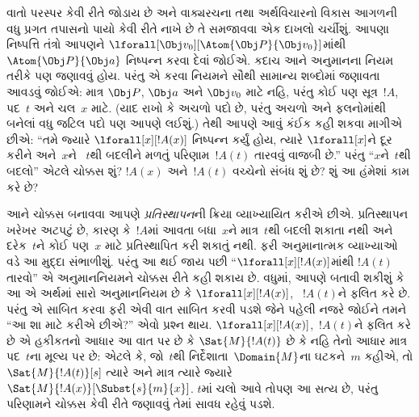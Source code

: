 
\label{guunit:OLP-0146}


વાતો પરસ્પર કેવી રીતે જોડાય છે અને વાક્યરચના તથા અર્થવિચારનો વિકાસ
આગળની વધુ પ્રગત તપાસનો પાયો કેવી રીતે નાખે છે તે સમજાવવા એક દાખલો
ચર્ચીશું. આપણા નિષ્પત્તિ તંત્રો આપણને
$\lforall[\Obj v_0][\Atom{\Obj P}{\Obj v_0}]$માંથી
$\Atom{\Obj P}{\Obj a}$ નિષ્પન્ન કરવા દેવાં જોઈએ. કદાચ આને
અનુમાનના નિયમ તરીકે પણ જણાવવું હોય. પરંતુ એ કરવા નિયમને સૌથી સામાન્ય
શબ્દોમાં જણાવતા આવડવું જોઈએ: માત્ર $\Obj P$, $\Obj a$ અને $\Obj v_0$
માટે નહિ, પરંતુ કોઈ પણ સૂત્ર~$!A$, પદ~$t$ અને ચલ~$x$
માટે. (યાદ રાખો કે અચળો પદો છે, પરંતુ અચળો અને
ફલનોમાંથી બનેલાં વધુ જટિલ પદો પણ આપણે લઈશું.) તેથી આપણે
આવું કંઈક કહી શકવા માગીએ છીએ: ``તમે જ્યારે $\lforall[x][!A(x)]$
નિષ્પન્ન કર્યું હોય, ત્યારે $\lforall[x]$ને દૂર કરીને અને~$x$ને
~$t$થી બદલીને મળતું પરિણામ~$!A(t)$ તારવવું વાજબી છે.'' પરંતુ
``$x$ને~$t$થી બદલો'' એટલે ચોક્કસ શું? $!A(x)$ અને~$!A(t)$ વચ્ચેનો
સંબંધ શું છે? શું આ હંમેશાં કામ કરે છે?

આને ચોક્કસ બનાવવા આપણે \emph{પ્રતિસ્થાપન}ની ક્રિયા વ્યાખ્યાયિત કરીએ
છીએ. પ્રતિસ્થાપન ખરેખર અટપટું છે, કારણ કે~$!A$માં આવતા બધા~$x$ને
માત્ર~$t$થી બદલી શકાતા નથી અને દરેક~$t$ને કોઈ પણ~$x$ માટે
પ્રતિસ્થાપિત કરી શકાતું નથી. ફરી અનુમાનાત્મક વ્યાખ્યાઓ વડે આ મુદ્દા
સંભાળીશું. પરંતુ આ થઈ જાય પછી ``$\lforall[x][!A(x)]$માંથી $!A(t)$
તારવો'' એ અનુમાનનિયમને ચોક્કસ રીતે કહી શકાય છે. વધુમાં, આપણે બતાવી
શકીશું કે આ એ અર્થમાં સારો અનુમાનનિયમ છે કે $\lforall[x][!A(x)]$,
~$!A(t)$ને ફલિત કરે છે. પરંતુ એ સાબિત કરવા ફરી એવી વાત સાબિત કરવી
પડશે જેને પહેલી નજરે જોઈને તમને ``આ શા માટે કરીએ છીએ?'' એવો પ્રશ્ન
થાય. $\lforall[x][!A(x)]$,~$!A(t)$ને ફલિત કરે છે એ હકીકતનો આધાર આ
વાત પર છે કે $\Sat{M}{!A(t)}$ છે કે નહિ તેનો આધાર માત્ર પદ~$t$ના
મૂલ્ય પર છે: એટલે કે, જો~$t$થી નિર્દેશાતા~$\Domain{M}$ના
ઘટકને~$m$ કહીએ, તો $\Sat{M}{!A(t)}[s]$ ત્યારે અને માત્ર ત્યારે
જ્યારે $\Sat{M}{!A(x)}[\Subst{s}{m}{x}]$. $t$માં ચલો આવે
તોપણ આ સત્ય છે, પરંતુ પરિણામને ચોક્કસ કેવી રીતે જણાવવું તેમાં સાવધ
રહેવું પડશે.
\endgroup


\begingroup
\makeatletter{}\makeatother


\label{guunit:OLP-0147}


